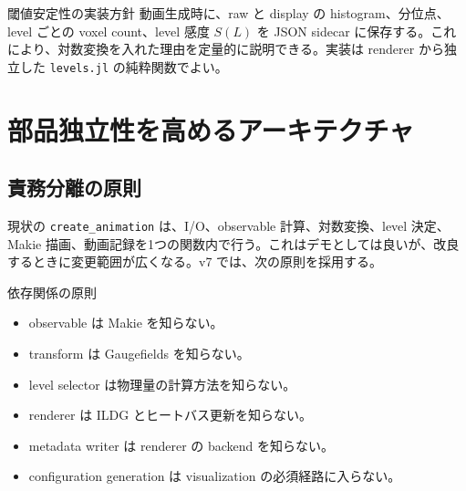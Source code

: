 \documentclass[uplatex,dvipdfmx,ja=standard,11pt,a4paper]{bxjsarticle}
\newcommand{\code}[1]{\texttt{#1}}
\begin{document}
\begin{proposalbox}{閾値安定性の実装方針}
動画生成時に、raw と display の histogram、分位点、level ごとの voxel count、level 感度 \(S(L)\) を JSON sidecar に保存する。これにより、対数変換を入れた理由を定量的に説明できる。実装は renderer から独立した \code{levels.jl} の純粋関数でよい。
\end{proposalbox}

\section{部品独立性を高めるアーキテクチャ}
\subsection{責務分離の原則}
現状の \code{create\_animation} は、I/O、observable 計算、対数変換、level 決定、Makie 描画、動画記録を1つの関数内で行う。これはデモとしては良いが、改良するときに変更範囲が広くなる。v7 では、次の原則を採用する。

\begin{proposalbox}{依存関係の原則}
\begin{itemize}[leftmargin=2em]
  \item observable は Makie を知らない。
  \item transform は Gaugefields を知らない。
  \item level selector は物理量の計算方法を知らない。
  \item renderer は ILDG とヒートバス更新を知らない。
  \item metadata writer は renderer の backend を知らない。
  \item configuration generation は visualization の必須経路に入らない。
\end{itemize}
\end{proposalbox}
\end{document}
